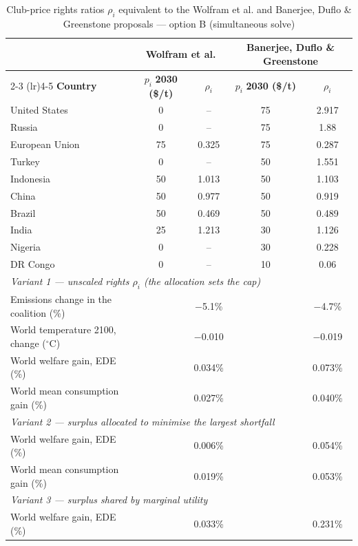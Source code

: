 \begin{table}[htbp]
\centering
\small
\caption{Club-price rights ratios $\rho_i$ equivalent to the Wolfram et al. and Banerjee, Duflo \& Greenstone proposals --- option B (simultaneous solve)}
\renewcommand{\arraystretch}{1.15}
\begin{tabular}{lcccc}
  \toprule
  & \multicolumn{2}{c}{\textbf{Wolfram et al.}} & \multicolumn{2}{c}{\textbf{Banerjee, Duflo \& Greenstone}} \\
  \cmidrule(lr){2-3} \cmidrule(lr){4-5}
  \textbf{Country} & $p_i$ \textbf{2030 (\$/t)} & $\rho_i$ & $p_i$ \textbf{2030 (\$/t)} & $\rho_i$ \\
  \midrule
  United States & 0 & -- & 75 & 2.917 \\
  Russia & 0 & -- & 75 & 1.88 \\
  European Union & 75 & 0.325 & 75 & 0.287 \\
  Turkey & 0 & -- & 50 & 1.551 \\
  Indonesia & 50 & 1.013 & 50 & 1.103 \\
  China & 50 & 0.977 & 50 & 0.919 \\
  Brazil & 50 & 0.469 & 50 & 0.489 \\
  India & 25 & 1.213 & 30 & 1.126 \\
  Nigeria & 0 & -- & 30 & 0.228 \\
  DR Congo & 0 & -- & 10 & 0.06 \\
  \midrule
  \multicolumn{5}{l}{\textit{Variant 1 --- unscaled rights $\rho_i$ (the allocation sets the cap)}} \\
  \quad Emissions change in the coalition (\%) &  & $-$5.1\% &  & $-$4.7\% \\
  \quad World temperature 2100, change ($^\circ$C) &  & $-$0.010 &  & $-$0.019 \\
  \quad World welfare gain, EDE (\%) &  & 0.034\% &  & 0.073\% \\
  \quad World mean consumption gain (\%) &  & 0.027\% &  & 0.040\% \\
  \midrule
  \multicolumn{5}{l}{\textit{Variant 2 --- surplus allocated to minimise the largest shortfall}} \\
  \quad World welfare gain, EDE (\%) &  & 0.006\% &  & 0.054\% \\
  \quad World mean consumption gain (\%) &  & 0.019\% &  & 0.053\% \\
  \midrule
  \multicolumn{5}{l}{\textit{Variant 3 --- surplus shared by marginal utility}} \\
  \quad World welfare gain, EDE (\%) &  & 0.033\% &  & 0.231\% \\

\end{tabular}
\end{table}
